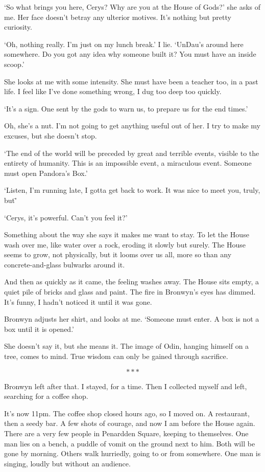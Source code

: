 `So what brings you here, Cerys? Why are you at the House of Gods?'
she asks of me. Her face doesn’t betray any ulterior motives. It’s
nothing but pretty curiosity.

`Oh, nothing really. I’m just on my lunch break.' I lie. `UnDau’s
around here somewhere. Do you got any idea why someone built it? You
must have an inside scoop.'

She looks at me with some intensity. She must have been a teacher too,
in a past life. I feel like I’ve done something wrong, I dug too deep
too quickly.

`It’s a sign. One sent by the gods to warn us, to prepare us for the
end times.'

Oh, she’s a nut. I’m not going to get anything useful out of her. I
try to make my excuses, but she doesn’t stop.

`The end of the world will be preceded by great and terrible events,
visible to the entirety of humanity. This is an impossible event, a
miraculous event. Someone must open Pandora’s Box.'

`Listen, I’m running late, I gotta get back to work. It was nice to
meet you, truly, but\='

`Cerys, it’s powerful. Can’t you feel it?'

Something about the way she says it makes me want to stay. To let the
House wash over me, like water over a rock, eroding it slowly but
surely. The House seems to grow, not physically, but it looms over us
all, more so than any concrete-and-glass bulwarks around it.

And then as quickly as it came, the feeling washes away. The House
sits empty, a quiet pile of bricks and glass and paint. The fire in
Bronwyn’s eyes has dimmed. It’s funny, I hadn’t noticed it until it
was gone.

Bronwyn adjusts her shirt, and looks at me. `Someone must enter. A box
is not a box until it is opened.'

She doesn’t say it, but she means it. The image of Odin, hanging
himself on a tree, comes to mind. True wisdom can only be gained
through sacrifice.

\[***\]

Bronwyn left after that. I stayed, for a time. Then I collected myself
and left, searching for a coffee shop.

It’s now 11pm. The coffee shop closed hours ago, so I moved on. A
restaurant, then a seedy bar. A few shots of courage, and now I am
before the House again. There are a very few people in Penardden
Square, keeping to themselves. One man lies on a bench, a puddle of
vomit on the ground next to him. Both will be gone by morning. Others
walk hurriedly, going to or from somewhere. One man is singing, loudly
but without an audience.

